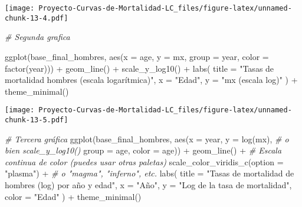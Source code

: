 \documentclass[
]{article}
\newenvironment{Shaded}{\begin{snugshade}}{\end{snugshade}}
\newcommand{\AttributeTok}[1]{\textcolor[rgb]{0.77,0.63,0.00}{#1}}
\newcommand{\CommentTok}[1]{\textcolor[rgb]{0.56,0.35,0.01}{\textit{#1}}}
\newcommand{\FunctionTok}[1]{\textcolor[rgb]{0.00,0.00,0.00}{#1}}
\newcommand{\NormalTok}[1]{#1}
\newcommand{\SpecialCharTok}[1]{\textcolor[rgb]{0.00,0.00,0.00}{#1}}
\newcommand{\StringTok}[1]{\textcolor[rgb]{0.31,0.60,0.02}{#1}}
\begin{document}
\texttt{[image: Proyecto-Curvas-de-Mortalidad-LC\_files/figure-latex/unnamed-chunk-13-4.pdf]}

\begin{Shaded}
\begin{Highlighting}[]
\CommentTok{\# Segunda grafica}

\FunctionTok{ggplot}\NormalTok{(base\_final\_hombres, }\FunctionTok{aes}\NormalTok{(}\AttributeTok{x =}\NormalTok{ age, }\AttributeTok{y =}\NormalTok{ mx, }\AttributeTok{group =}\NormalTok{ year, }\AttributeTok{color =} \FunctionTok{factor}\NormalTok{(year))) }\SpecialCharTok{+}
  \FunctionTok{geom\_line}\NormalTok{() }\SpecialCharTok{+}
  \FunctionTok{scale\_y\_log10}\NormalTok{() }\SpecialCharTok{+}
  \FunctionTok{labs}\NormalTok{(}
    \AttributeTok{title =} \StringTok{"Tasas de mortalidad hombres (escala logarítmica)"}\NormalTok{,}
    \AttributeTok{x =} \StringTok{"Edad"}\NormalTok{,}
    \AttributeTok{y =} \StringTok{"mx (escala log)"}
\NormalTok{  ) }\SpecialCharTok{+}
  \FunctionTok{theme\_minimal}\NormalTok{()}
\end{Highlighting}
\end{Shaded}

\texttt{[image: Proyecto-Curvas-de-Mortalidad-LC\_files/figure-latex/unnamed-chunk-13-5.pdf]}

\begin{Shaded}
\begin{Highlighting}[]
\CommentTok{\# Tercera gráfica}
\FunctionTok{ggplot}\NormalTok{(base\_final\_hombres, }\FunctionTok{aes}\NormalTok{(}\AttributeTok{x =}\NormalTok{ year, }
                               \AttributeTok{y =} \FunctionTok{log}\NormalTok{(mx),       }\CommentTok{\# o bien scale\_y\_log10()}
                               \AttributeTok{group =}\NormalTok{ age, }
                               \AttributeTok{color =}\NormalTok{ age)) }\SpecialCharTok{+}
  \FunctionTok{geom\_line}\NormalTok{() }\SpecialCharTok{+}
  \CommentTok{\# Escala continua de color (puedes usar otras paletas)}
  \FunctionTok{scale\_color\_viridis\_c}\NormalTok{(}\AttributeTok{option =} \StringTok{"plasma"}\NormalTok{) }\SpecialCharTok{+}  \CommentTok{\# o "magma", "inferno", etc.}
  \FunctionTok{labs}\NormalTok{(}
    \AttributeTok{title =} \StringTok{"Tasas de mortalidad de hombres (log) por año y edad"}\NormalTok{,}
    \AttributeTok{x =} \StringTok{"Año"}\NormalTok{,}
    \AttributeTok{y =} \StringTok{"Log de la tasa de mortalidad"}\NormalTok{,}
    \AttributeTok{color =} \StringTok{"Edad"}
\NormalTok{  ) }\SpecialCharTok{+}
  \FunctionTok{theme\_minimal}\NormalTok{()}
\end{Highlighting}
\end{Shaded}
\end{document}
